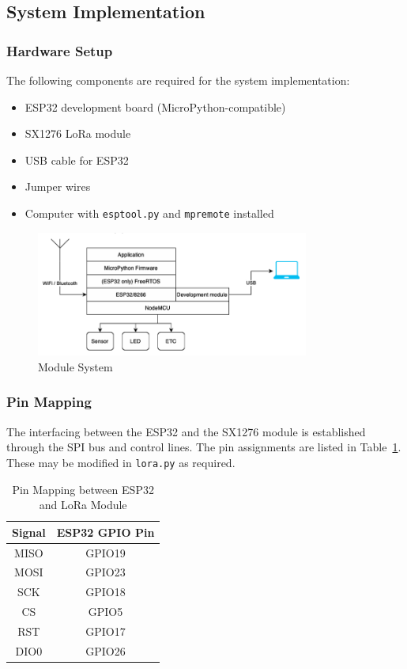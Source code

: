 \subsection{System Implementation}

\subsubsection{Hardware Setup}
The following components are required for the system implementation:
\begin{itemize}
    \item ESP32 development board (MicroPython-compatible)
    \item SX1276 LoRa module
    \item USB cable for ESP32
    \item Jumper wires
    \item Computer with \texttt{esptool.py} and \texttt{mpremote} installed
\end{itemize}

\begin{figure}[htbp]
\begin{center}
\includegraphics[width=0.8\textwidth]{system.png}
\end{center}
\caption[Picture]{Module System}
\label{fig:system}
\end{figure}

\subsubsection{Pin Mapping}
The interfacing between the ESP32 and the SX1276 module is established through the SPI bus and control lines.  
The pin assignments are listed in Table~\ref{tab:pinmapping}. These may be modified in \texttt{lora.py} as required.

\begin{table}[htbp]
\centering
\label{tab:pinmapping}
\begin{tabular}{|c|c|}
\hline
\textbf{Signal} & \textbf{ESP32 GPIO Pin} \\ \hline
MISO & GPIO19 \\ \hline
MOSI & GPIO23 \\ \hline
SCK  & GPIO18 \\ \hline
CS   & GPIO5  \\ \hline
RST  & GPIO17 \\ \hline
DIO0 & GPIO26 \\ \hline
\end{tabular}
\caption{Pin Mapping between ESP32 and LoRa Module}
\end{table}

